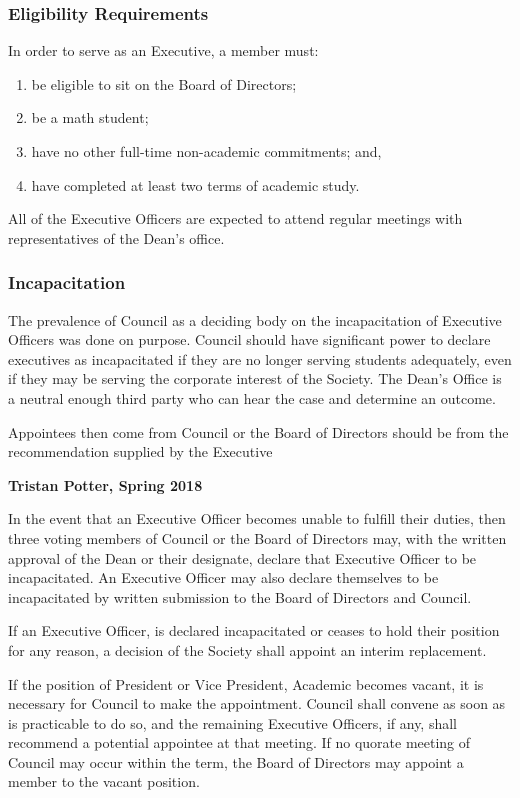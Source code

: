 \subsubsection{Eligibility Requirements}
In order to serve as an Executive, a member must:
\begin{enumerate}
    \item be eligible to sit on the Board of Directors;
    \item be a math student; 
    \item have no other full-time non-academic commitments; and,
    \item have completed at least two terms of academic study.
\end{enumerate}

All of the Executive Officers are expected to attend regular meetings with
representatives of the Dean's office.

\subsubsection{Incapacitation}
\begin{annotation}
    The prevalence of Council as a deciding body on the incapacitation of 
    Executive Officers was done on purpose. Council should have significant
    power to declare executives as incapacitated if they are no longer
    serving students adequately, even if they may be serving the corporate
    interest of the Society. The Dean's Office is a neutral enough third party
    who can hear the case and determine an outcome.

    Appointees then come from Council or the Board of Directors should be from
    the recommendation supplied by the Executive

    \textbf{Tristan Potter, Spring 2018}
\end{annotation}

In the event that an Executive Officer becomes unable to fulfill their duties,
then three voting members of Council or the Board of Directors may,
with the written approval of the Dean or their designate, declare that Executive
Officer to be incapacitated. An Executive Officer may also declare themselves
to be incapacitated by written submission to the Board of Directors and
Council.

If an Executive Officer, is declared incapacitated or ceases to hold their
position for any reason, a decision of the Society shall appoint an interim
replacement. 

If the position of President or Vice President, Academic becomes vacant, it
is necessary for Council to make the appointment. Council shall convene
as soon as is practicable to do so, and the remaining Executive Officers, if
any, shall recommend a potential appointee at that meeting. If no quorate
meeting of Council may occur within the term, the Board of Directors may 
appoint a member to the vacant position.


